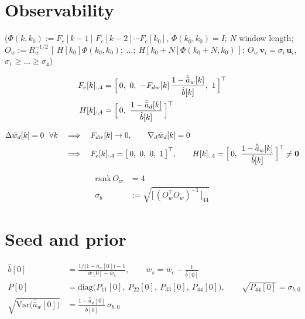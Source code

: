 \documentclass[11pt,a4paper,fontset=none]{ctexart}
\newcommand{\ba}{\bar{a}}
\newcommand{\bw}{\bar{w}}
\newcommand{\ah}{\hat{\ba}_w}
\newcommand{\bh}{\hat{b}}
\newcommand{\ad}{\hat{\ba}_d}
\begin{document}
\clearpage
\section{Observability}

($\Phi(k,k_0) := F_e[k-1]\,F_e[k-2]\cdots F_e[k_0]$, $\Phi(k_0,k_0) = I$; $N$ window length;
$O_w := R_w^{-1/2}\,[\,H[k_0]\Phi(k_0,k_0);\ \dots;\ H[k_0+N]\Phi(k_0+N,k_0)\,]$;
$O_w\,\mathbf{v}_i = \sigma_i\,\mathbf{u}_i$, $\sigma_1 \ge \dots \ge \sigma_4$)

\begin{align*}
F_e[k]_{:,4} &= \Bigl[\,0,\ 0,\ -F_{dw}[k]\,\frac{1-\ah[k]}{\bh[k]},\ 1\,\Bigr]^{\top} \\
H[k]_{:,4}   &= \Bigl[\,0,\ \frac{1-\ad[k]}{\bh[k]}\,\Bigr]^{\top}
\end{align*}

\begin{align*}
\Delta\bw_d[k] = 0 \ \ \forall k \quad&\Longrightarrow\quad F_{dw}[k] \to 0, \qquad \nabla_d\bw_d[k] = 0 \\
&\Longrightarrow\quad F_e[k]_{:,4} = \bigl[\,0,\ 0,\ 0,\ 1\,\bigr]^{\top}, \qquad
H[k]_{:,4} = \Bigl[\,0,\ \frac{1-\ah[k]}{\bh[k]}\,\Bigr]^{\top} \neq \mathbf{0}
\end{align*}

\begin{align*}
\mathrm{rank}\,O_w &= 4 \\
\sigma_b &:= \sqrt{\bigl[\,(O_w^{\top}O_w)^{-1}\,\bigr]_{44}}
\end{align*}

\section*{Seed and prior}

\begin{align*}
\bh[0]      &= \frac{1/\bigl(1-\ba_w[0]\bigr) - 1}{\bw[0] - \bw_c}, \qquad \bw_s = \bw_c - \frac{1}{\bh[0]} \\
P[0]        &= \mathrm{diag}\bigl(P_{11}[0],\ P_{22}[0],\ P_{33}[0],\ P_{44}[0]\bigr), \qquad \sqrt{P_{44}[0]} = \sigma_{b,0} \\
\sqrt{\mathrm{Var}\bigl(\ah[0]\bigr)} &= \frac{1-\ah[0]}{\bh[0]}\,\sigma_{b,0}
\end{align*}
\end{document}

